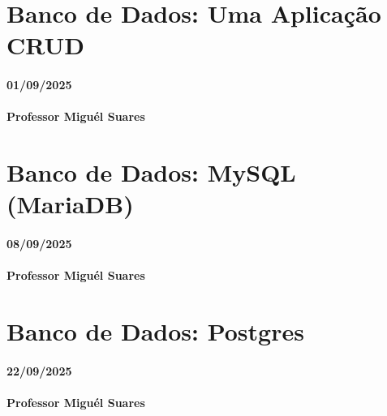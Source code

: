 \documentclass[
]{book}
\begin{document}
\chapter{Banco de Dados: Uma Aplicação CRUD}\label{banco-de-dados-uma-aplicauxe7uxe3o-crud}

\subsubsection*{01/09/2025}\label{section-4}

\subsubsection*{Professor Miguél Suares}\label{professor-miguuxe9l-suares-4}

\chapter{Banco de Dados: MySQL (MariaDB)}\label{banco-de-dados-mysql-mariadb}

\subsubsection*{08/09/2025}\label{section-5}

\subsubsection*{Professor Miguél Suares}\label{professor-miguuxe9l-suares-5}

\chapter{Banco de Dados: Postgres}\label{banco-de-dados-postgres}

\subsubsection*{22/09/2025}\label{section-6}

\subsubsection*{Professor Miguél Suares}\label{professor-miguuxe9l-suares-6}
\end{document}
